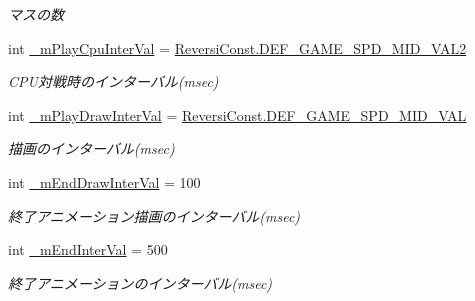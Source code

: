 \begin{DoxyCompactItemize}
\begin{DoxyCompactList}\small\item\em マスの数 \end{DoxyCompactList}\item 
\mbox{\label{class_reversi_form_1_1_reversi_setting_aee15a9e0438db076ac6113e6e0f1f420}} 
int \hyperlink{class_reversi_form_1_1_reversi_setting_aee15a9e0438db076ac6113e6e0f1f420}{\+\_\+m\+Play\+Cpu\+Inter\+Val} = \hyperlink{class_reversi_form_1_1_reversi_const_aa592855c2bfebcee79817d24707b5312}{Reversi\+Const.\+D\+E\+F\+\_\+\+G\+A\+M\+E\+\_\+\+S\+P\+D\+\_\+\+M\+I\+D\+\_\+\+V\+A\+L2}
\begin{DoxyCompactList}\small\item\em C\+P\+U対戦時のインターバル(msec) \end{DoxyCompactList}\item 
\mbox{\label{class_reversi_form_1_1_reversi_setting_a13be9cb10d0c7aada29bfbf9f944c89c}} 
int \hyperlink{class_reversi_form_1_1_reversi_setting_a13be9cb10d0c7aada29bfbf9f944c89c}{\+\_\+m\+Play\+Draw\+Inter\+Val} = \hyperlink{class_reversi_form_1_1_reversi_const_aed26d5ee8a8ac88690436ab4be759748}{Reversi\+Const.\+D\+E\+F\+\_\+\+G\+A\+M\+E\+\_\+\+S\+P\+D\+\_\+\+M\+I\+D\+\_\+\+V\+AL}
\begin{DoxyCompactList}\small\item\em 描画のインターバル(msec) \end{DoxyCompactList}\item 
\mbox{\label{class_reversi_form_1_1_reversi_setting_a2f0e08317ab08dc398bc2ba4f489bb0c}} 
int \hyperlink{class_reversi_form_1_1_reversi_setting_a2f0e08317ab08dc398bc2ba4f489bb0c}{\+\_\+m\+End\+Draw\+Inter\+Val} = 100
\begin{DoxyCompactList}\small\item\em 終了アニメーション描画のインターバル(msec) \end{DoxyCompactList}\item 
\mbox{\label{class_reversi_form_1_1_reversi_setting_a43aada5f816a8b659058d2b532f7be95}} 
int \hyperlink{class_reversi_form_1_1_reversi_setting_a43aada5f816a8b659058d2b532f7be95}{\+\_\+m\+End\+Inter\+Val} = 500
\begin{DoxyCompactList}\small\item\em 終了アニメーションのインターバル(msec) \end{DoxyCompactList}\item 

\end{DoxyCompactItemize}
